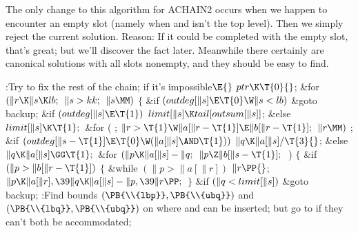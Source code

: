 The only change to this algorithm for {\mc ACHAIN2} occurs
when we happen
to encounter an empty slot (namely when  and 
isn't the top level). Then we simply reject the current solution.
Reason: If it could be completed with the empty slot, that's great; but
we'll discover the fact later. Meanwhile there certainly are canonical
solutions with all slots nonempty, and they should be easy to find.

\Y\B\4:Try to fix the rest of the chain;  if it's
impossible\X${}\E{}$\6
$\\{ptr}\K\T{0}{}$;\6
\&{for} ${}(\|r\K\|s\K\\{lb};{}$ ${}\|s>\\{kk};{}$ ${}\|s\MM){}$\5
${}\{{}$\1\6
\&{if} ${}(\\{outdeg}[\|s]\E\T{0}\W\|s<\\{lb}){}$\1\5
\&{goto} \\{backup};\2\6
\&{if} ${}(\\{outdeg}[\|s]\E\T{1}){}$\1\5
${}\\{limit}[\|s]\K\\{tail}[\\{outsum}[\|s]]{}$;\5
\2\&{else}\1\5
${}\\{limit}[\|s]\K\T{1};{}$\2\6
\&{for} ( ; ${}\|r>\T{1}\W\|a[\|r-\T{1}]\E\|b[\|r-\T{1}];{}$ ${}\|r\MM){}$\1\5
;\2\6
\&{if} ${}(\\{outdeg}[\|s-\T{1}]\E\T{0}\W(\|a[\|s]\AND\T{1})){}$\1\5
${}\|q\K\|a[\|s]/\T{3}{}$;\5
\2\&{else}\1\5
${}\|q\K\|a[\|s]\GG\T{1};{}$\2\6
\&{for} ${}(\|p\K\|a[\|s]-\|q;{}$ ${}\|p\Z\|b[\|s-\T{1}];{}$ \,)\5
${}\{{}$\1\6
\&{if} ${}(\|p>\|b[\|r-\T{1}]){}$\5
${}\{{}$\1\6
\&{while} ${}(\|p>\|a[\|r]){}$\1\5
${}\|r\PP{}$;\2\6
${}\|p\K\|a[\|r],\39\|q\K\|a[\|s]-\|p,\39\|r\PP;{}$\6
\4${}\}{}$\2\6
\&{if} ${}(\|q<\\{limit}[\|s]){}$\1\5
\&{goto} \\{backup};\2\6
:Find bounds $(\PB{\\{lbp}},\PB{\\{ubq}})$ and $(\PB{\\{lbq}},\PB{%
\\{ubq}})$ on where  and  can be inserted; but go to  if they can't both be accommodated\X;\6

